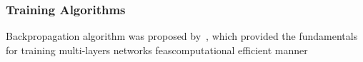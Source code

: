 \subsubsection{Training Algorithms}
Backpropagation algorithm was proposed by~\citet{werbos1975beyond}, which provided the fundamentals for training multi-layers networks feascomputational efficient manner